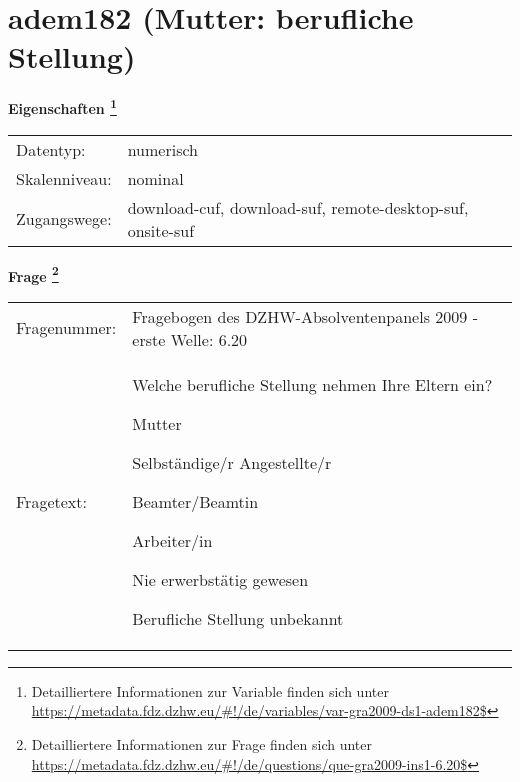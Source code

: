
    \setcounter{footnote}{0}

    \vspace*{-1.8cm}
	\section{adem182 (Mutter: berufliche Stellung)}
	\label{section:adem182}



    \vspace*{0.5cm}
    \noindent\textbf{Eigenschaften
	\footnote{Detailliertere Informationen zur Variable finden sich unter
		\url{https://metadata.fdz.dzhw.eu/\#!/de/variables/var-gra2009-ds1-adem182$}}}\\
	\begin{tabularx}{\hsize}{@{}lX}
	Datentyp: & numerisch \\
	Skalenniveau: & nominal \\
	Zugangswege: &
	  download-cuf, 
	  download-suf, 
	  remote-desktop-suf, 
	  onsite-suf
 \\
    \end{tabularx}



				\vspace*{0.5cm}
                \noindent\textbf{Frage
	                \footnote{Detailliertere Informationen zur Frage finden sich unter
		              \url{https://metadata.fdz.dzhw.eu/\#!/de/questions/que-gra2009-ins1-6.20$}}}\\
				\begin{tabularx}{\hsize}{@{}lX}
					Fragenummer: &
					  Fragebogen des DZHW-Absolventenpanels 2009 - erste Welle:
					  6.20
 \\
					Fragetext: & Welche berufliche Stellung nehmen Ihre Eltern ein?\par  Mutter\par  Selbständige/r Angestellte/r\par  Beamter/Beamtin\par  Arbeiter/in\par  Nie erwerbstätig gewesen\par  Berufliche Stellung unbekannt \\
				\end{tabularx}





